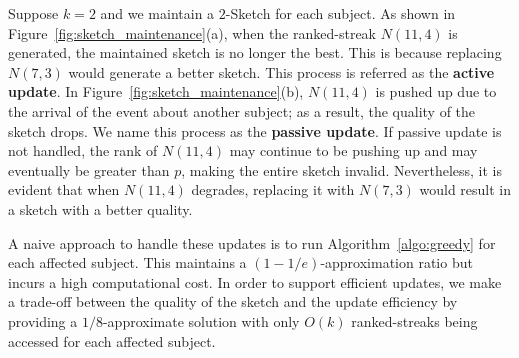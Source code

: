 \begin{example}
Suppose $k = 2$ and we maintain a $2$-Sketch for each subject. As shown in Figure~\ref{fig:sketch_maintenance}(a), 
when the ranked-streak $N(11,4)$ is generated, the maintained sketch is no longer the best. 
This is because replacing 
$N(7,3)$ would generate a better sketch. This process is referred as the \textbf{active update}.
In Figure~\ref{fig:sketch_maintenance}(b), $N(11,4)$ is pushed up due to the arrival of the event about another subject; as a result, the quality of the sketch drops. We name this process as the \textbf{passive update}. 
If passive update is not handled, the rank of $N(11,4)$ may continue to be pushing up and may eventually be greater than $p$, making the entire sketch invalid. Nevertheless, it is evident that when $N(11,4)$ degrades, replacing it with $N(7,3)$ would
result in a sketch with a better quality. 
\end{example}

A naive approach to handle these updates is to run Algorithm~\ref{algo:greedy} for each affected subject.
This maintains a $(1-1/e)$-approximation ratio but incurs a high computational cost. 
In order to support efficient updates, we make a trade-off between 
the quality of the sketch and the update efficiency by 
providing a $1/8$-approximate solution with 
only $O(k)$ ranked-streaks being accessed for each affected subject. 

